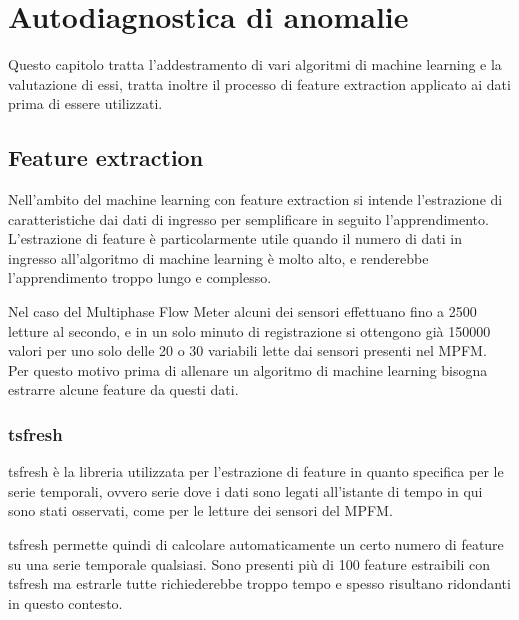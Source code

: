 \chapter{Autodiagnostica di anomalie}
\label{AutodiagnosticaDiAnomalie}

Questo capitolo tratta l'addestramento di vari algoritmi di machine learning e la valutazione di essi, tratta inoltre il processo di feature extraction applicato ai dati prima di essere utilizzati.

\section{Feature extraction}
Nell'ambito del machine learning con feature extraction si intende l'estrazione di caratteristiche dai dati di ingresso per semplificare in seguito l'apprendimento.
L'estrazione di feature è particolarmente utile quando il numero di dati in ingresso all'algoritmo di machine learning è molto alto, e renderebbe l'apprendimento troppo lungo e complesso.

Nel caso del Multiphase Flow Meter alcuni dei sensori effettuano fino a 2500 letture al secondo, e in un solo minuto di registrazione si ottengono già 150000 valori per uno solo delle 20 o 30 variabili lette dai sensori presenti nel MPFM.
Per questo motivo prima di allenare un algoritmo di machine learning bisogna estrarre alcune feature da questi dati.

\subsection{tsfresh}
tsfresh è la libreria utilizzata per l'estrazione di feature in quanto specifica per le serie temporali, ovvero serie dove i dati sono legati all'istante di tempo in qui sono stati osservati, come per le letture dei sensori del MPFM.

tsfresh permette quindi di calcolare automaticamente un certo numero di feature su una serie temporale qualsiasi. Sono presenti più di 100 feature estraibili con tsfresh ma estrarle tutte richiederebbe troppo tempo e spesso risultano ridondanti in questo contesto.


